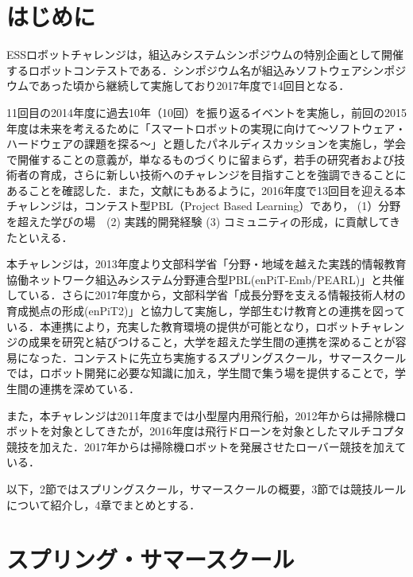 \documentclass[submit]{ipsj}
\begin{document}
\maketitle

\section{はじめに}

ESSロボットチャレンジは，組込みシステムシンポジウムの特別企画として開催するロボットコンテストである．シンポジウム名が組込みソフトウェアシンポジウムであった頃から継続して実施しており2017年度で14回目となる．

11回目の2014年度に過去10年（10回）を振り返るイベントを実施し\cite{essrc2014}，前回の2015年度は未来を考えるために「スマートロボットの実現に向けて〜ソフトウェア・ハードウェアの課題を探る〜」と題したパネルディスカッションを実施し，学会で開催することの意義が，単なるものづくりに留まらず，若手の研究者および技術者の育成，さらに新しい技術へのチャレンジを目指すことを強調できることにあることを確認した\cite{essrc2015}．また，文献\cite{watanabe2016pbl}にもあるように，2016年度で13回目を迎える本チャレンジは，コンテスト型PBL（Project Based Learning）であり， (1）分野を超えた学びの場　(2) 実践的開発経験 (3) コミュニティの形成，に貢献してきたといえる．

本チャレンジは，2013年度より文部科学省「分野・地域を越えた実践的情報教育協働ネットワーク組込みシステム分野連合型PBL(enPiT-Emb/PEARL)」と共催している\cite{enpitweb}\cite{essrcweb}．さらに2017年度から，文部科学省「成長分野を支える情報技術人材の育成拠点の形成(enPiT2)」と協力して実施し，学部生むけ教育との連携を図っている．本連携により，充実した教育環境の提供が可能となり，ロボットチャレンジの成果を研究と結びつけること，大学を超えた学生間の連携を深めることが容易になった．コンテストに先立ち実施するスプリングスクール，サマースクールでは，ロボット開発に必要な知識に加え，学生間で集う場を提供することで，学生間の連携を深めている．

また，本チャレンジは2011年度までは小型屋内用飛行船，2012年からは掃除機ロボットを対象としてきたが，2016年度は飛行ドローンを対象としたマルチコプタ競技を加えた．2017年からは掃除機ロボットを発展させたローバー競技を加えている．

以下，2節ではスプリングスクール，サマースクールの概要，3節では競技ルールについて紹介し，4章でまとめとする．


\section{スプリング・サマースクール}
\end{document}
